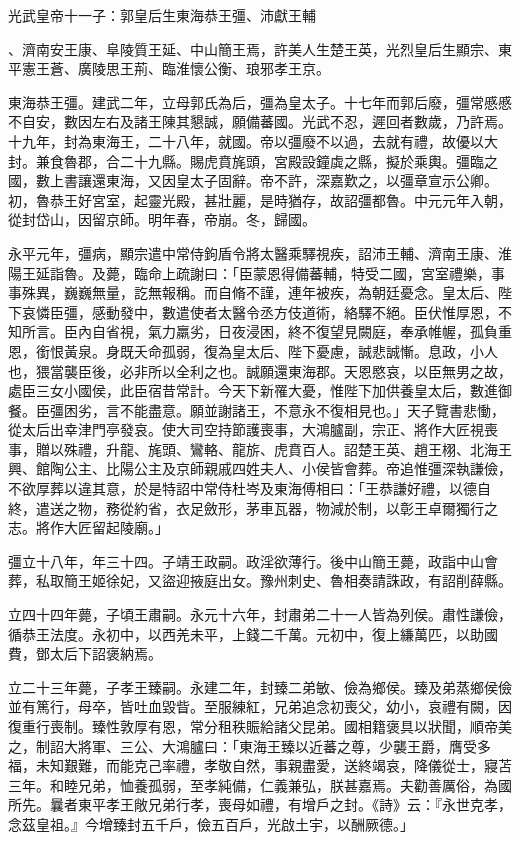 
\begin{pinyinscope}
光武皇帝十一子：郭皇后生東海恭王彊、沛獻王輔

、濟南安王康、阜陵質王延、中山簡王焉，許美人生楚王英，光烈皇后生顯宗、東平憲王蒼、廣陵思王荊、臨淮懷公衡、琅邪孝王京。

東海恭王彊。建武二年，立母郭氏為后，彊為皇太子。十七年而郭后廢，彊常慼慼不自安，數因左右及諸王陳其懇誠，願備蕃國。光武不忍，遲回者數歲，乃許焉。十九年，封為東海王，二十八年，就國。帝以彊廢不以過，去就有禮，故優以大封。兼食魯郡，合二十九縣。賜虎賁旄頭，宮殿設鐘虡之縣，擬於乘輿。彊臨之國，數上書讓還東海，又因皇太子固辭。帝不許，深嘉歎之，以彊章宣示公卿。初，魯恭王好宮室，起靈光殿，甚壯麗，是時猶存，故詔彊都魯。中元元年入朝，從封岱山，因留京師。明年春，帝崩。冬，歸國。

永平元年，彊病，顯宗遣中常侍鉤盾令將太醫乘驛視疾，詔沛王輔、濟南王康、淮陽王延詣魯。及薨，臨命上疏謝曰：「臣蒙恩得備蕃輔，特受二國，宮室禮樂，事事殊異，巍巍無量，訖無報稱。而自脩不謹，連年被疾，為朝廷憂念。皇太后、陛下哀憐臣彊，感動發中，數遣使者太醫令丞方伎道術，絡驛不絕。臣伏惟厚恩，不知所言。臣內自省視，氣力羸劣，日夜浸困，終不復望見闕庭，奉承帷幄，孤負重恩，銜恨黃泉。身既夭命孤弱，復為皇太后、陛下憂慮，誠悲誠慚。息政，小人也，猥當襲臣後，必非所以全利之也。誠願還東海郡。天恩愍哀，以臣無男之故，處臣三女小國侯，此臣宿昔常計。今天下新罹大憂，惟陛下加供養皇太后，數進御餐。臣彊困劣，言不能盡意。願並謝諸王，不意永不復相見也。」天子覽書悲慟，從太后出幸津門亭發哀。使大司空持節護喪事，大鴻臚副，宗正、將作大匠視喪事，贈以殊禮，升龍、旄頭、鸞輅、龍旂、虎賁百人。詔楚王英、趙王栩、北海王興、館陶公主、比陽公主及京師親戚四姓夫人、小侯皆會葬。帝追惟彊深執謙儉，不欲厚葬以違其意，於是特詔中常侍杜岑及東海傅相曰：「王恭謙好禮，以德自終，遣送之物，務從約省，衣足斂形，茅車瓦器，物減於制，以彰王卓爾獨行之志。將作大匠留起陵廟。」

彊立十八年，年三十四。子靖王政嗣。政淫欲薄行。後中山簡王薨，政詣中山會葬，私取簡王姬徐妃，又盜迎掖庭出女。豫州刺史、魯相奏請誅政，有詔削薛縣。

立四十四年薨，子頃王肅嗣。永元十六年，封肅弟二十一人皆為列侯。肅性謙儉，循恭王法度。永初中，以西羌未平，上錢二千萬。元初中，復上縑萬匹，以助國費，鄧太后下詔褒納焉。

立二十三年薨，子孝王臻嗣。永建二年，封臻二弟敏、儉為鄉侯。臻及弟蒸鄉侯儉並有篤行，母卒，皆吐血毀眥。至服練紅，兄弟追念初喪父，幼小，哀禮有闕，因復重行喪制。臻性敦厚有恩，常分租秩賑給諸父昆弟。國相籍褒具以狀聞，順帝美之，制詔大將軍、三公、大鴻臚曰：「東海王臻以近蕃之尊，少襲王爵，膺受多福，未知艱難，而能克己率禮，孝敬自然，事親盡愛，送終竭哀，降儀從士，寢苫三年。和睦兄弟，恤養孤弱，至孝純備，仁義兼弘，朕甚嘉焉。夫勸善厲俗，為國所先。曩者東平孝王敞兄弟行孝，喪母如禮，有增戶之封。《詩》云：『永世克孝，念茲皇祖。』今增臻封五千戶，儉五百戶，光啟土宇，以酬厥德。」


\end{pinyinscope}
